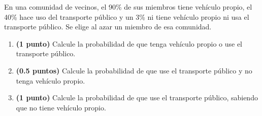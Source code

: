 
En una comunidad de vecinos, el 90\% de sus miembros tiene vehículo propio,
el 40\% hace uso del transporte público y un 3\% ni tiene vehículo propio
ni usa el transporte público. Se elige al azar un miembro de esa comunidad.
\begin{enumerate}[label=\alph*)]
  \item \textbf{(1 punto)} Calcule la probabilidad de que tenga vehículo
  propio o use el transporte público.
  \item \textbf{(0.5 puntos)} Calcule la probabilidad de que use el transporte
  público y no tenga vehículo propio.
  \item \textbf{(1 punto)} Calcule la probabilidad de que use el transporte
  público, sabiendo que no tiene vehículo propio.
\end{enumerate}
